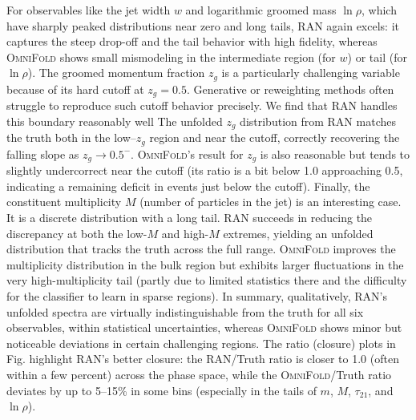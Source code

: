             For observables like the jet width $w$ and logarithmic groomed mass $\ln\rho$, which have sharply peaked distributions near zero and long tails, RAN again excels: it captures the steep drop-off and the tail behavior with high fidelity, whereas \textsc{OmniFold} shows small mismodeling in the intermediate region (for $w$) or tail (for $\ln\rho$).
            The groomed momentum fraction $z_g$ is a particularly challenging variable because of its hard cutoff at $z_g=0.5$.
            Generative or reweighting methods often struggle to reproduce such cutoff behavior precisely.
            We find that RAN handles this boundary reasonably well
            The unfolded $z_g$ distribution from RAN matches the truth both in the low--$z_g$ region and near the cutoff, correctly recovering the falling slope as $z_g \to 0.5^-$.
            \textsc{OmniFold}’s result for $z_g$ is also reasonable but tends to slightly undercorrect near the cutoff (its ratio is a bit below 1.0 approaching 0.5, indicating a remaining deficit in events just below the cutoff).
            Finally, the constituent multiplicity $M$ (number of particles in the jet) is an interesting case.
            It is a discrete distribution with a long tail.
            RAN succeeds in reducing the discrepancy at both the low-$M$ and high-$M$ extremes, yielding an unfolded distribution that tracks the truth across the full range.
            \textsc{OmniFold} improves the multiplicity distribution in the bulk region but exhibits larger fluctuations in the very high-multiplicity tail (partly due to limited statistics there and the difficulty for the classifier to learn in sparse regions).
            In summary, qualitatively, RAN’s unfolded spectra are virtually indistinguishable from the truth for all six observables, within statistical uncertainties, whereas \textsc{OmniFold} shows minor but noticeable deviations in certain challenging regions.
            The ratio (closure) plots in Fig. highlight RAN’s better closure: the RAN/Truth ratio is closer to 1.0 (often within a few percent) across the phase space, while the \textsc{OmniFold}/Truth ratio deviates by up to 5–15\% in some bins (especially in the tails of $m$, $M$, $\tau_{21}$, and $\ln\rho$).


